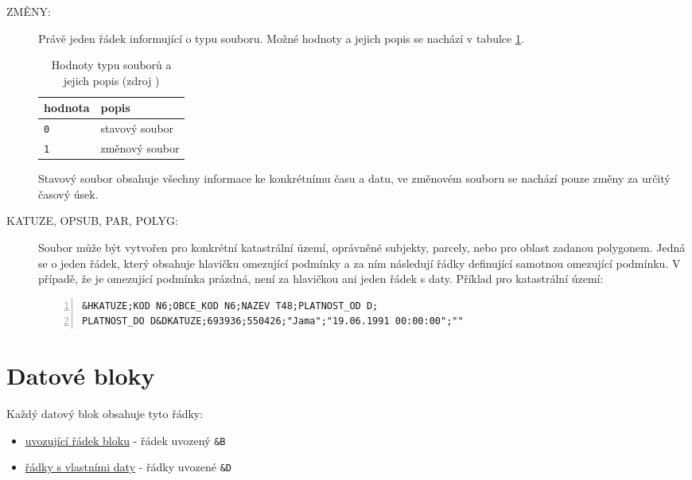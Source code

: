 \begin{description}
	\item[ZMĚNY:] Právě jeden řádek informující o typu souboru. Možné hodnoty a jejich popis se nachází v tabulce \ref{tab:zmeny}.

		\begin{table}[H]
		\begin{tabular}{|l|l|}
		\hline
		 hodnota & popis \\
		\hline
		\hline
		 \texttt{0} & stavový soubor \\ \hline
		 \texttt{1} & změnový soubor \\
		 \hline
		\end{tabular}
		 \centering
		  \caption{Hodnoty typu souborů a jejich popis (zdroj \citep{struktura_vfk})}
		  \label{tab:zmeny}
		\end{table}

Stavový soubor obsahuje všechny informace ke konkrétnímu času a datu, ve změnovém souboru se nachází pouze změny za určitý časový úsek.

	\item[KATUZE, OPSUB, PAR, POLYG:] Soubor  může být vytvořen pro konkrétní katastrální území, oprávněné subjekty, parcely, nebo pro oblast zadanou polygonem. Jedná se o jeden řádek, který obsahuje hlavičku omezující podmínky a za ním následují řádky definující samotnou omezující podmínku. V případě, že je omezující podmínka prázdná, není za hlavičkou ani jeden řádek s daty. Příklad pro katastrální území:

\begin{lstlisting}[basicstyle=\footnotesize\ttfamily, backgroundcolor = \color{light-gray},  numbers=left]
&HKATUZE;KOD N6;OBCE_KOD N6;NAZEV T48;PLATNOST_OD D;
PLATNOST_DO D&DKATUZE;693936;550426;"Jama";"19.06.1991 00:00:00";""
 \end{lstlisting}

\end{description}

\section{Datové bloky}
\label{datove_bloky}

Každý datový blok obsahuje tyto řádky:

	\begin{itemize}[leftmargin=1.5cm]
		\item \underline{uvozující řádek bloku} - řádek uvozený \texttt{\&B}
		\item \underline{řádky s vlastními daty} - řádky uvozené \texttt{\&D}
	\end{itemize}

